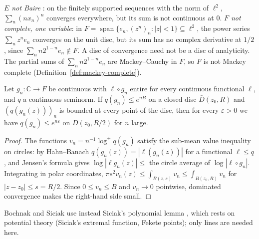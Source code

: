 \begin{remark}[Counterexamples]
  \label{rem:bs-counterexamples}
  \leanok
  \emph{$E$ not Baire} \cite[Counterexample~5.1]{BS71b}: on the finitely supported sequences
  with the norm of $\ell^2$, $\sum_n (n x_n)^n$ converges everywhere, but its sum is not
  continuous at $0$. \emph{$F$ not complete, one variable}: in
  $F = \operatorname{span}\{e_n, (z^n)_n : |z| < 1\} \subseteq \ell^2$, the power series
  $\sum_n z^n e_n$ converges on the unit disc, but its sum has no complex derivative at $1/2$,
  since $\sum_n n 2^{1-n} e_n \notin F$. A disc of convergence need not be a disc of analyticity.
  The partial sums of $\sum_n n 2^{1-n} e_n$ are Mackey--Cauchy in $F$, so $F$ is not Mackey
  complete (Definition~\ref{def:mackey-complete}).
\end{remark}

\begin{lemma}
  \label{lem:hartogs}
  \leanok
  Let $g_n \colon \mathbb{C} \to F$ be continuous with $\ell \circ g_n$ entire for every
  continuous functional $\ell$, and $q$ a continuous seminorm. If $q(g_n) \le e^{nB}$ on a closed
  disc $\bar D(z_0, R)$ and $(q(g_n(z)))_n$ is bounded at every point of the disc, then for every
  $\varepsilon > 0$ we have $q(g_n) \le e^{n\varepsilon}$ on $\bar D(z_0, R/2)$ for $n$ large.
\end{lemma}

\begin{proof}
  \leanok
  The functions $v_n = n^{-1} \log^+ q(g_n)$ satisfy the sub-mean value inequality on circles:
  by Hahn--Banach $q(g_n(z)) = |\ell(g_n(z))|$ for a functional $\ell \le q$, and Jensen's formula
  gives $\log |\ell g_n(z)| \le$ the circle average of $\log |\ell \circ g_n|$. Integrating in
  polar coordinates, $\pi s^2 v_n(z) \le \int_{B(z,s)} v_n \le \int_{B(z_0,R)} v_n$ for
  $|z - z_0| \le s = R/2$. Since $0 \le v_n \le B$ and $v_n \to 0$ pointwise, dominated
  convergence makes the right-hand side small.
\end{proof}

Bochnak and Siciak use instead Siciak's polynomial lemma \cite[\S4]{BS71b}, which rests on
potential theory (Siciak's extremal function, Fekete points); only lines are needed here.

